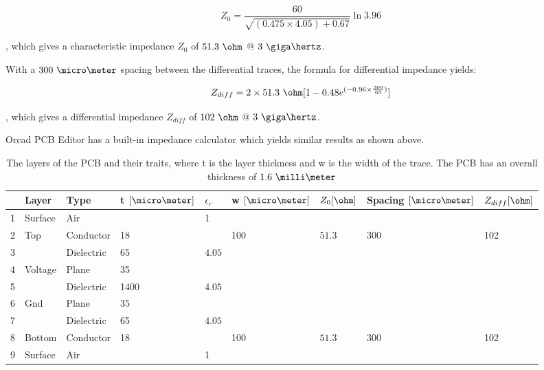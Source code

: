 \documentclass[main.tex]{subfiles}
\begin{document}
\begin{equation}
Z_0 = \frac{60}{\sqrt{(0.475 \times 4.05) + 0.67}}\ln{3.96}
\end{equation}

, which gives a characteristic impedance $Z_0$ of $51.3\ \ohm$ @ $3\ \giga\hertz$. 

With a $300\ \micro\meter$ spacing between the differential traces, the formula for differential impedance yields:

\begin{equation}
    Z_{diff} = 2 \times 51.3\ \ohm [1 - 0.48 e^{(-0.96 \times \frac{300}{65})}]
\end{equation}

, which gives a differential impedance $Z_{diff}$ of $102\ \ohm$ @ $3\ \giga\hertz$.


Orcad PCB Editor has a built-in impedance calculator which yields similar results as shown above.

\begin{table} [ht]
\begin{center}
    \begin{tabular}{| l | l | l | l | l | l | l | l | l |}
    \hline
     & Layer & Type & t $[\micro\meter]$ & $\epsilon_r$ & w $[\micro\meter]$  & $Z_0 [\ohm]$ & Spacing $[\micro\meter]$  & $Z_{diff} [\ohm]$ \\ 
     \hline
    1 	  & Surface & Air 		 & 		& 1 	 & 	   & 					& 	  & \\ \hline
    2 	  & Top 	& Conductor  & 18 	&        & 100 & $51.3$             & 300 & 102\\ \hline
    3 	  &  		& Dielectric & 65 	& $4.05$ & 	   & 					& 	  & \\ \hline
    4 	  & Voltage & Plane 	 & 35 	&        & 	   & 					& 	  & \\ \hline
    5 	  &  		& Dielectric & 1400 & $4.05$ & 	   &					&	  & \\ \hline
    6 	  & Gnd 	& Plane 	 & 35 	&        & 	   & 					& 	  & \\ \hline
    7 	  &  		& Dielectric & 65 	& $4.05$ &     & 					& 	  & \\ \hline
    8 	  & Bottom 	& Conductor  & 18 	&        & 100 & $51.3$             & 300 & 102\\ \hline
    9 	  & Surface & Air 		 & 	  	& 1 	 & 	   & 					& 	  & \\ \hline
    \end{tabular}
     \caption{The layers of the PCB and their traits, where t is the layer thickness and w is the width of the trace. The PCB has an overall thickness of $1.6\ \milli\meter$}
	\label{tab:Xsect1}
\end{center}
\end{table}
\end{document}

